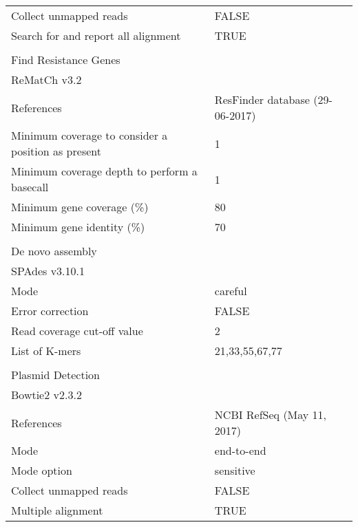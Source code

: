 \begin{table}[h!]
{\begin{tabular}{ll}
Collect unmapped reads                             & FALSE                              \\
Search for and report all alignment                & TRUE                               \\
                                                   &                                    \\
\multicolumn{2}{l}{Find Resistance Genes}                                               \\
ReMatCh v3.2                                       &                                    \\
References                                         & ResFinder database (29-06-2017)    \\
Minimum coverage to consider a position as present & 1                                  \\
Minimum coverage depth to perform a basecall       & 1                                  \\
Minimum gene coverage (\%)                         & 80                                 \\
Minimum gene identity (\%)                         & 70                                 \\
                                                   &                                    \\
\multicolumn{2}{l}{De novo assembly}                                                    \\
SPAdes v3.10.1                                     &                                    \\
Mode                                               & careful                            \\
Error correction                                   & FALSE                              \\
Read coverage cut-off value                        & 2                                  \\
List of K-mers                                     & 21,33,55,67,77                     \\
                                                   &                                    \\
\multicolumn{2}{l}{Plasmid Detection}                                                   \\
Bowtie2 v2.3.2                                     &                                    \\
References                                         & NCBI RefSeq (May 11, 2017)         \\
Mode                                               & end-to-end                         \\
Mode option                                        & sensitive                          \\
Collect unmapped reads                             & FALSE                              \\
Multiple alignment                                 & TRUE                              
\end{tabular}%
}
\end{table}